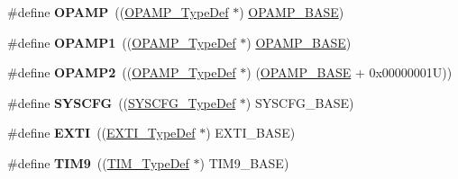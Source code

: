 \begin{DoxyCompactItemize}
\item 
\hypertarget{group___peripheral__declaration_gaaa993d5a85ac85c8abbd13e31d504bb6}{\#define {\bfseries O\-P\-A\-M\-P}~((\hyperlink{struct_o_p_a_m_p___type_def}{O\-P\-A\-M\-P\-\_\-\-Type\-Def} $\ast$) \hyperlink{group___peripheral__memory__map_ga6e9722d15c7ed794f0eca9682f64c03c}{O\-P\-A\-M\-P\-\_\-\-B\-A\-S\-E})}\label{group___peripheral__declaration_gaaa993d5a85ac85c8abbd13e31d504bb6}

\item 
\hypertarget{group___peripheral__declaration_gaf0025add8d004b4f4bf6eaeedd55c488}{\#define {\bfseries O\-P\-A\-M\-P1}~((\hyperlink{struct_o_p_a_m_p___type_def}{O\-P\-A\-M\-P\-\_\-\-Type\-Def} $\ast$) \hyperlink{group___peripheral__memory__map_ga6e9722d15c7ed794f0eca9682f64c03c}{O\-P\-A\-M\-P\-\_\-\-B\-A\-S\-E})}\label{group___peripheral__declaration_gaf0025add8d004b4f4bf6eaeedd55c488}

\item 
\hypertarget{group___peripheral__declaration_gabc11c296d6d15ca861b6378bc056848e}{\#define {\bfseries O\-P\-A\-M\-P2}~((\hyperlink{struct_o_p_a_m_p___type_def}{O\-P\-A\-M\-P\-\_\-\-Type\-Def} $\ast$) (\hyperlink{group___peripheral__memory__map_ga6e9722d15c7ed794f0eca9682f64c03c}{O\-P\-A\-M\-P\-\_\-\-B\-A\-S\-E} + 0x00000001\-U))}\label{group___peripheral__declaration_gabc11c296d6d15ca861b6378bc056848e}

\item 
\hypertarget{group___peripheral__declaration_ga3c833fe1c486cb62250ccbca32899cb8}{\#define {\bfseries S\-Y\-S\-C\-F\-G}~((\hyperlink{struct_s_y_s_c_f_g___type_def}{S\-Y\-S\-C\-F\-G\-\_\-\-Type\-Def} $\ast$) S\-Y\-S\-C\-F\-G\-\_\-\-B\-A\-S\-E)}\label{group___peripheral__declaration_ga3c833fe1c486cb62250ccbca32899cb8}

\item 
\hypertarget{group___peripheral__declaration_ga9189e770cd9b63dadd36683eb9843cac}{\#define {\bfseries E\-X\-T\-I}~((\hyperlink{struct_e_x_t_i___type_def}{E\-X\-T\-I\-\_\-\-Type\-Def} $\ast$) E\-X\-T\-I\-\_\-\-B\-A\-S\-E)}\label{group___peripheral__declaration_ga9189e770cd9b63dadd36683eb9843cac}

\item 
\hypertarget{group___peripheral__declaration_gaf52b4b4c36110a0addfa98059f54a50e}{\#define {\bfseries T\-I\-M9}~((\hyperlink{struct_t_i_m___type_def}{T\-I\-M\-\_\-\-Type\-Def} $\ast$) T\-I\-M9\-\_\-\-B\-A\-S\-E)}\label{group___peripheral__declaration_gaf52b4b4c36110a0addfa98059f54a50e}


\end{DoxyCompactItemize}
